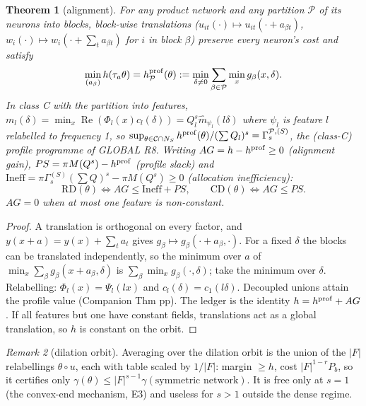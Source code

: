 \documentclass[11pt]{article}
\newtheorem{theorem}{Theorem}
\theoremstyle{remark}
\newtheorem{remark}[theorem]{Remark}
\newcommand{\Re}{\operatorname{Re}}
\renewcommand{\Re}{\operatorname{Re}}
\begin{document}
\begin{theorem}[alignment]\label{thm:R}
For any product network and any partition $\mathcal P$ of its neurons into blocks, block-wise translations
($u_{it}(\cdot)\mapsto u_{it}(\cdot+a_{\beta t})$, $w_i(\cdot)\mapsto w_i(\cdot+\sum_ta_{\beta t})$ for $i$ in block $\beta$) preserve every
neuron's cost and satisfy
\[\min_{(a_\beta)}h(\tau_a\theta)=h^{\rm prof}_{\mathcal P}(\theta):=\min_{\delta\ne0}\sum_{\beta\in\mathcal P}\min_xg_\beta(x,\delta).\]
In class C with the partition into features, $m_l(\delta)=\min_x\Re(\Phi_l(x)c_l(\delta))=Q_l^s\hat m_{\psi_l}(l\delta)$ where $\psi_l$ is
feature $l$ relabelled to frequency 1, so
$\sup_{\theta\in\mathcal C\cap N_S}h^{\rm prof}(\theta)/(\sum Q_l)^s=\Gamma^{\mathcal P,(S)}_s$, the (class-C) profile programme of
GLOBAL R8.  Writing $AG=h-h^{\rm prof}\ge0$ (alignment gain), $PS=\pi M(Q^s)-h^{\rm prof}$ (profile slack) and
$\mathrm{Ineff}=\pi\Gamma^{(S)}_s(\sum Q)^s-\pi M(Q^s)\ge0$ (allocation inefficiency):
\[\mathrm{RD}(\theta)\iff AG\le\mathrm{Ineff}+PS,\qquad\mathrm{CD}(\theta)\iff AG\le PS .\]
$AG=0$ when at most one feature is non-constant.
\end{theorem}
\begin{proof}
A translation is orthogonal on every factor, and $y(x+a)=y(x)+\sum_ta_t$ gives $g_\beta\mapsto g_\beta(\cdot+a_\beta,\cdot)$.  For a fixed
$\delta$ the blocks can be translated independently, so the minimum over $a$ of $\min_x\sum_\beta g_\beta(x+a_\beta,\delta)$ is
$\sum_\beta\min_xg_\beta(\cdot,\delta)$; take the minimum over $\delta$.  Relabelling: $\Phi_l(x)=\Psi_l(lx)$ and $c_l(\delta)=c_1(l\delta)$.
Decoupled unions attain the profile value (Companion Thm pp).  The ledger is the identity $h=h^{\rm prof}+AG$.  If all features
but one have constant fields, translations act as a global translation, so $h$ is constant on the orbit.
\end{proof}

\begin{remark}[dilation orbit]
Averaging over the dilation orbit is the union of the $|F|$ relabellings $\theta\circ u$, each with table scaled by $1/|F|$:
margin $\ge h$, cost $|F|^{1-r}P_b$, so it certifies only $\gamma(\theta)\le|F|^{s-1}\gamma(\text{symmetric network})$.  It is free only
at $s=1$ (the convex-end mechanism, E3) and useless for $s>1$ outside the dense regime.
\end{remark}
\end{document}
